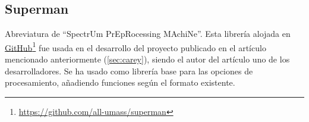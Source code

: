 \subsection{Superman}\label{lib:superman}

Abreviatura de ``SpectrUm PrEpRocessing MAchiNe''. Esta librería alojada en
\href{https://github.com/all-umass/superman}{GitHub}\footnote{\url{https://github.com/all-umass/superman}}
fue usada en el desarrollo del proyecto publicado en el artículo mencionado
anteriormente (\ref{sec:carey})\cite{art:raman-carey}, siendo el autor del
artículo uno de los desarrolladores. Se ha usado como librería base para las
opciones de procesamiento, añadiendo funciones según el formato existente.

